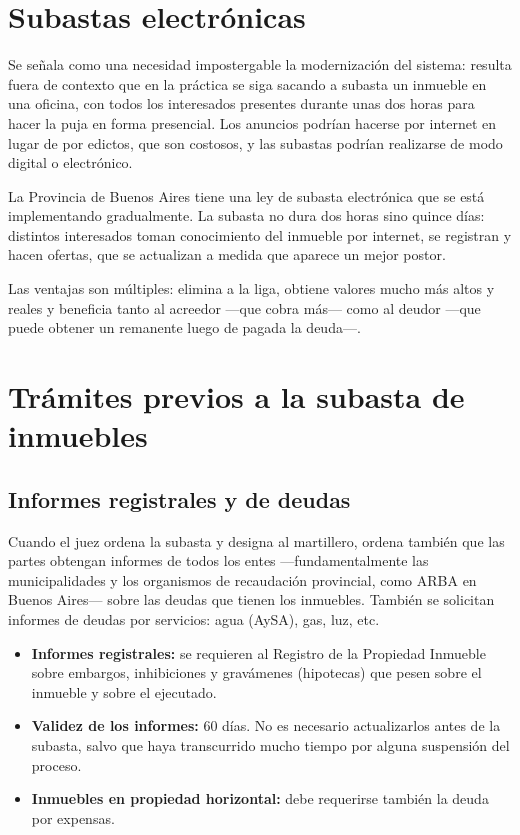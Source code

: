\documentclass[12pt,oneside]{book}
\begin{document}
\section{Subastas electrónicas}

Se señala como una necesidad impostergable la modernización del sistema: resulta fuera de contexto que en la práctica se siga sacando a subasta un inmueble en una oficina, con todos los interesados presentes durante unas dos horas para hacer la puja en forma presencial. Los anuncios podrían hacerse por internet en lugar de por edictos, que son costosos, y las subastas podrían realizarse de modo digital o electrónico.

La Provincia de Buenos Aires tiene una ley de subasta electrónica que se está implementando gradualmente. La subasta no dura dos horas sino quince días: distintos interesados toman conocimiento del inmueble por internet, se registran y hacen ofertas, que se actualizan a medida que aparece un mejor postor.

Las ventajas son múltiples: elimina a la liga, obtiene valores mucho más altos y reales y beneficia tanto al acreedor ---que cobra más--- como al deudor ---que puede obtener un remanente luego de pagada la deuda---.

\section{Trámites previos a la subasta de inmuebles}

\subsection{Informes registrales y de deudas}

Cuando el juez ordena la subasta y designa al martillero, ordena también que las partes obtengan informes de todos los entes ---fundamentalmente las municipalidades y los organismos de recaudación provincial, como ARBA en Buenos Aires--- sobre las deudas que tienen los inmuebles. También se solicitan informes de deudas por servicios: agua (AySA), gas, luz, etc.

\begin{itemize}
    \item \textbf{Informes registrales:} se requieren al Registro de la Propiedad Inmueble sobre embargos, inhibiciones y gravámenes (hipotecas) que pesen sobre el inmueble y sobre el ejecutado.
    \item \textbf{Validez de los informes:} 60 días. No es necesario actualizarlos antes de la subasta, salvo que haya transcurrido mucho tiempo por alguna suspensión del proceso.
    \item \textbf{Inmuebles en propiedad horizontal:} debe requerirse también la deuda por expensas.
\end{itemize}
\end{document}
